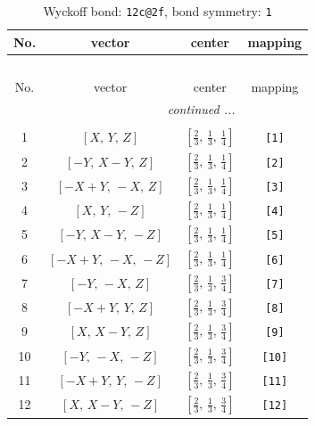 \documentclass[fleqn,8pt]{jsarticle}
\begin{document}
\renewcommand{\arraystretch}{1.2}
\begin{longtable}{cccc}
\caption{Wyckoff bond: {\tt 12c@2f}, bond symmetry: {\tt 1}}
 \\
 \hline \hline
No. & vector & center & mapping \\ \hline \endfirsthead

\multicolumn{3}{l}{\tablename\ \thetable{}} \\
 \hline \hline
No. & vector & center & mapping \\ \hline \endhead

 \hline \hline
\multicolumn{3}{r}{\footnotesize\it continued ...} \\ \endfoot

 \hline \hline
\multicolumn{3}{r}{} \\ \endlastfoot

1 & $\left[ X,\, Y,\, Z \right]$ & $\left[ \frac{2}{3},\, \frac{1}{3},\, \frac{1}{4} \right]$ & {\tt [1]} \\ \hline
2 & $\left[ - Y,\, X - Y,\, Z \right]$ & $\left[ \frac{2}{3},\, \frac{1}{3},\, \frac{1}{4} \right]$ & {\tt [2]} \\ \hline
3 & $\left[ - X + Y,\, - X,\, Z \right]$ & $\left[ \frac{2}{3},\, \frac{1}{3},\, \frac{1}{4} \right]$ & {\tt [3]} \\ \hline
4 & $\left[ X,\, Y,\, - Z \right]$ & $\left[ \frac{2}{3},\, \frac{1}{3},\, \frac{1}{4} \right]$ & {\tt [4]} \\ \hline
5 & $\left[ - Y,\, X - Y,\, - Z \right]$ & $\left[ \frac{2}{3},\, \frac{1}{3},\, \frac{1}{4} \right]$ & {\tt [5]} \\ \hline
6 & $\left[ - X + Y,\, - X,\, - Z \right]$ & $\left[ \frac{2}{3},\, \frac{1}{3},\, \frac{1}{4} \right]$ & {\tt [6]} \\ \hline
7 & $\left[ - Y,\, - X,\, Z \right]$ & $\left[ \frac{2}{3},\, \frac{1}{3},\, \frac{3}{4} \right]$ & {\tt [7]} \\ \hline
8 & $\left[ - X + Y,\, Y,\, Z \right]$ & $\left[ \frac{2}{3},\, \frac{1}{3},\, \frac{3}{4} \right]$ & {\tt [8]} \\ \hline
9 & $\left[ X,\, X - Y,\, Z \right]$ & $\left[ \frac{2}{3},\, \frac{1}{3},\, \frac{3}{4} \right]$ & {\tt [9]} \\ \hline
10 & $\left[ - Y,\, - X,\, - Z \right]$ & $\left[ \frac{2}{3},\, \frac{1}{3},\, \frac{3}{4} \right]$ & {\tt [10]} \\ \hline
11 & $\left[ - X + Y,\, Y,\, - Z \right]$ & $\left[ \frac{2}{3},\, \frac{1}{3},\, \frac{3}{4} \right]$ & {\tt [11]} \\ \hline
12 & $\left[ X,\, X - Y,\, - Z \right]$ & $\left[ \frac{2}{3},\, \frac{1}{3},\, \frac{3}{4} \right]$ & {\tt [12]} \\
\end{longtable}
\end{document}
